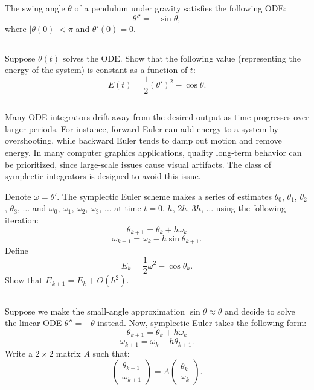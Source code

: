 The swing angle $\theta$ of a pendulum under gravity satisfies the following ODE:
$$\theta'' = -\sin \theta,$$
where $|\theta(0)| < \pi$ and $\theta'(0) = 0$.

\subsection{} Suppose $\theta(t)$ solves the ODE. Show that the following value (representing the energy of the system) is constant as a function of $t$:
$$E(t) = \frac{1}{2}(\theta')^2 - \cos \theta.$$

\subsection{} Many ODE integrators drift away from the desired output as time progresses over larger periods. For instance, forward Euler can add energy to a system by overshooting, while backward Euler tends to damp out motion and remove energy. In many computer graphics applications, quality long-term behavior can be prioritized, since large-scale issues cause visual artifacts. The class of symplectic integrators is designed to avoid this issue.

Denote $\omega = \theta'$. The symplectic Euler scheme makes a series of estimates $\theta_ 0$, $\theta_ 1$, $\theta_ 2$, $\theta_ 3$, $\hdots$ and $\omega_0$, $\omega_1$, $\omega_2$, $\omega_3$, $\hdots$ at time $t = 0$, $h$, $2h$, $3h$, $\hdots$ using the following iteration:
$$\theta_{k+1} = \theta_k + h\omega_k$$
$$\omega_{k+1} = \omega_k - h \sin \theta_{k+1}.$$
Define
$$E_k = \frac{1}{2}\omega^2 - \cos \theta_k.$$
Show that $E_{k+1} = E_k + O(h^2)$.

\subsection{} \label{q} Suppose we make the small-angle approximation $\sin \theta \approx \theta$ and decide to solve the linear ODE $\theta'' = -\theta$ instead. Now, symplectic Euler takes the following form:
$$\theta_{k+1} = \theta_k + h\omega_k$$
$$\omega_{k+1} = \omega_k - h\theta_{k+1}.$$
Write a $2 \times 2$ matrix $A$ such that:
$$
\left(\begin{matrix}
  \theta_{k+1} \\
  \omega_{k+1}
  \end{matrix} \right)
=
A
  \left(\begin{matrix}
     \theta_k \\
  \omega_k
  \end{matrix} \right)
  .$$

